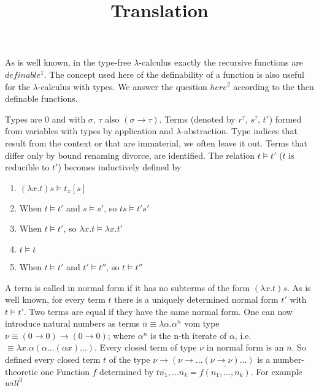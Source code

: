 \documentclass[11pt]{article}
\title{ Translation }
\begin{document}
\maketitle	

\section*{}


As is well known, in the type-free $\lambda$-calculus exactly the recursive functions are
$definable^1$. The concept used here of the definability of a function
is also useful for the $\lambda$-calculus with types. We answer the question $here^2$ according to the then definable functions.

Types are $0$ and with $\sigma$, $\tau$ also \((\sigma \rightarrow \tau)\). Terms (denoted by \(r^\tau\), \(s^\tau\), \(t^\tau\))
formed from variables with types by application and \(\lambda\)-abstraction. Type indices that result from the context or that are immaterial,
we often leave it out. Terms that differ only by bound renaming
divorce, are identified. The relation \(t \models t'\) ($t$ is reducible to $t'$) becomes inductively defined by

\begin{enumerate}
    \item $(\lambda x. t) s \models t_x[s]$
    \item When \(t \models t'\) and \(s \models s'\), so \(t s \models t' s'\)
    \item When \(t \models t'\), so \(\lambda x.t \models \lambda x.t'\)
    \item \(t \models t\)
    \item When \(t \models t'\) and \(t' \models t''\), so \(t \models t''\)
\end{enumerate}

A term is called in normal form if it has no subterms of the form \((\lambda x.t) s\). As is well known, for every term $t$ there is a uniquely determined normal form \(t'\) with \(t \models t'\). Two terms are equal if they have the same normal form. One can now introduce natural numbers as terms 
\( \overline{n} \equiv \lambda \alpha . \alpha^n\) vom
type \(\nu \equiv (0 \rightarrow 0) \rightarrow (0 \rightarrow 0)\); where \(\alpha^n\) is the n-th iterate of \(\alpha\), i.e. \(\equiv \lambda x.\alpha(\alpha...(\alpha x)...)\).
Every closed term of type \(\nu\) in normal form is an \(\overline{n}\). So defined every closed term \(t\) of the type \(\nu \rightarrow (\nu \rightarrow ...(\nu \rightarrow \nu)...)\) is a number-theoretic one
Function $f$ determined by $t\overline{n_1},...\overline{n_k} = \overline{f(n_1,...,n_k)}$. For example $will^3$
\end{document}

